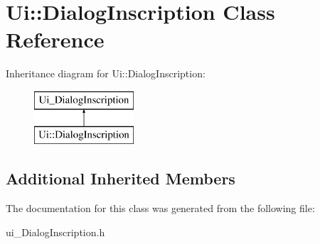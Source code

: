 \section{Ui\-:\-:Dialog\-Inscription Class Reference}
\label{class_ui_1_1_dialog_inscription}
Inheritance diagram for Ui\-:\-:Dialog\-Inscription\-:\begin{figure}[H]
\begin{center}
\leavevmode
\includegraphics[height=2.000000cm]{class_ui_1_1_dialog_inscription}
\end{center}
\end{figure}
\subsection*{Additional Inherited Members}


The documentation for this class was generated from the following file\-:\begin{DoxyCompactItemize}
\item 
ui\-\_\-\-Dialog\-Inscription.\-h\end{DoxyCompactItemize}
